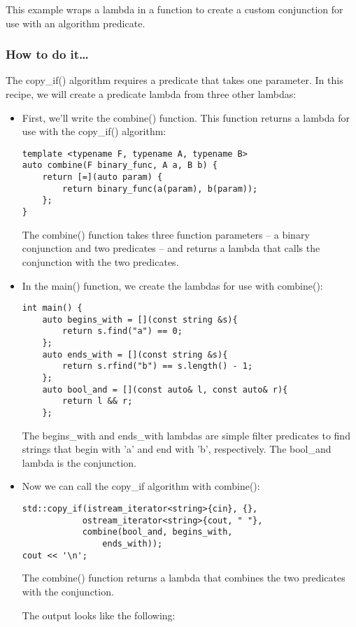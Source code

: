
This example wraps a lambda in a function to create a custom conjunction for use with an algorithm predicate.

\subsubsection{How to do it…}

The copy\_if() algorithm requires a predicate that takes one parameter. In this recipe, we will create a predicate lambda from three other lambdas:

\begin{itemize}
\item 
First, we'll write the combine() function. This function returns a lambda for use with the copy\_if() algorithm:

\begin{lstlisting}[style=styleCXX]
template <typename F, typename A, typename B>
auto combine(F binary_func, A a, B b) {
	return [=](auto param) {
		return binary_func(a(param), b(param));
	};
}
\end{lstlisting}

The combine() function takes three function parameters – a binary conjunction and two predicates – and returns a lambda that calls the conjunction with the two predicates.

\item 
In the main() function, we create the lambdas for use with combine():

\begin{lstlisting}[style=styleCXX]
int main() {
	auto begins_with = [](const string &s){
		return s.find("a") == 0;
	};
	auto ends_with = [](const string &s){
		return s.rfind("b") == s.length() - 1;
	};
	auto bool_and = [](const auto& l, const auto& r){
		return l && r;
	};
\end{lstlisting}

The begins\_with and ends\_with lambdas are simple filter predicates to find strings that begin with 'a' and end with 'b', respectively. The bool\_and lambda is the conjunction.

\item 
Now we can call the copy\_if algorithm with combine():

\begin{lstlisting}[style=styleCXX]
std::copy_if(istream_iterator<string>{cin}, {},
			ostream_iterator<string>{cout, " "},
			combine(bool_and, begins_with,
				ends_with));
cout << '\n';
\end{lstlisting}

The combine() function returns a lambda that combines the two predicates with the conjunction.

The output looks like the following:

\end{itemize}

